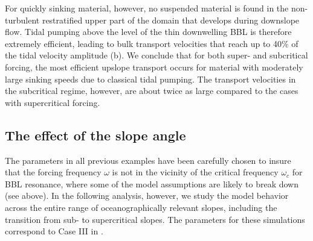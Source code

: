 For quickly sinking material, however, no suspended material is found
in the non-turbulent restratified upper part of the domain that
develops during downslope flow. Tidal pumping above the level of the
thin downwelling BBL is therefore extremely efficient, leading to bulk
transport velocities that reach up to 40\% of the tidal velocity
amplitude (b). We conclude that for both super- and
subcritical forcing, the most efficient upslope transport occurs for
material with moderately large sinking speeds due to classical tidal
pumping. The transport velocities in the subcritical regime, however,
are about twice as large compared to the cases with supercritical
forcing.

\subsection{The effect of the slope angle}
The parameters in all previous examples have been carefully chosen to
insure that the forcing frequency $\omega$ is not in the vicinity of
the critical frequency $\omega_c$ for BBL resonance, where some of the
model assumptions are likely to break down (see above). In the
following analysis, however, we study the model behavior across the
entire range of oceanographically relevant slopes, including the
transition from sub- to supercritical slopes. The parameters for these
simulations correspond to Case III in .

